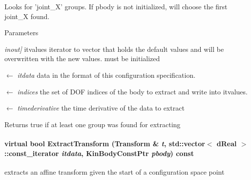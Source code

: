 Looks for 'joint\_\-X' groups. If pbody is not initialized, will choose the first joint\_\-X found. 
\begin{DoxyParams}{Parameters}
\item[{\em inout\mbox{]}}]itvalues iterator to vector that holds the default values and will be overwritten with the new values. must be initialized \item[\mbox{$\leftarrow$} {\em itdata}]data in the format of this configuration specification. \item[\mbox{$\leftarrow$} {\em indices}]the set of DOF indices of the body to extract and write into itvalues. \item[\mbox{$\leftarrow$} {\em timederivative}]the time derivative of the data to extract \end{DoxyParams}
\begin{DoxyReturn}{Returns}
true if at least one group was found for extracting 
\end{DoxyReturn}
\hypertarget{classOpenRAVE_1_1ConfigurationSpecification_a49774ecb66f1a96880369215a33d079b}{
\paragraph[{ExtractTransform}]{\setlength{\rightskip}{0pt plus 5cm}virtual bool ExtractTransform (Transform \& {\em t}, \/  std::vector$<$ dReal $>$::const\_\-iterator {\em itdata}, \/  KinBodyConstPtr {\em pbody}) const}\hfill}
\label{classOpenRAVE_1_1ConfigurationSpecification_a49774ecb66f1a96880369215a33d079b}


extracts an affine transform given the start of a configuration space point 

